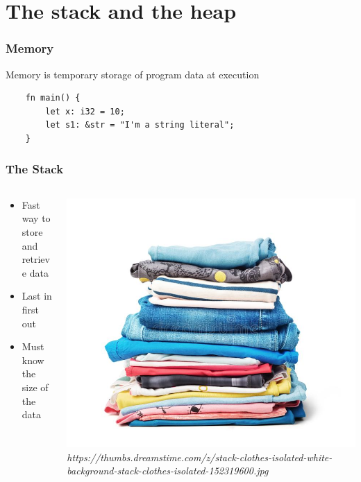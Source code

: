 \documentclass{beamer}
\begin{document}
\section{The stack and the heap}
\begin{frame}[fragile]
    \frametitle{Memory}
    Memory is temporary storage of program data at execution
    \begin{verbatim}
    fn main() {
        let x: i32 = 10;
        let s1: &str = "I'm a string literal";
    }
    \end{verbatim}
\end{frame}
\begin{frame}
    \frametitle{The Stack}
    \begin{columns}
        \begin{column}{0.5\textwidth}
            \begin{itemize}
                \item Fast way to store and retrieve data
                \item Last in first out
                \item Must know the size of the data
            \end{itemize}
        \end{column}
        \begin{column}{0.5\textwidth}
            \includegraphics[width=\textwidth]{images/stack.png}
            \vfill
            \tiny \textit{https://thumbs.dreamstime.com/z/stack-clothes-isolated-white-background-stack-clothes-isolated-152319600.jpg}
        \end{column}
    \end{columns}
\end{frame}
\end{document}
